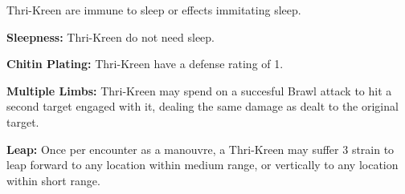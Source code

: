 {Thri-Kreen are immune to sleep or effects immitating sleep.}
{\item \textbf{Sleepness:} Thri-Kreen do not need sleep. }
{\item \textbf{Chitin Plating:} Thri-Kreen have a defense rating of 1.}
{\item \textbf{Multiple Limbs:} Thri-Kreen may spend \advantage\advantage on a succesful Brawl attack to hit a second target engaged with it, dealing the same damage as dealt to the original target.}
{\item \textbf{Leap:} Once per encounter as a manouvre, a Thri-Kreen may suffer 3 strain to leap forward to any location within medium range, or vertically to any location within short range.}
{}
{}
{}
{}
{}

